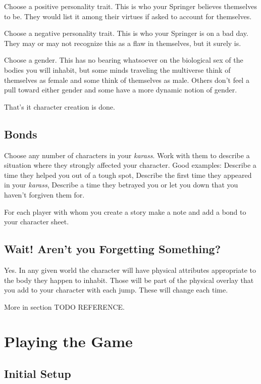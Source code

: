 \documentclass[letterpaper,12pt,landscape,twocolumn]{book}
\begin{document}
Choose a positive personality trait. This is who your Springer
believes themselves to be. They would list it among their virtues if
asked to account for themselves.

Choose a negative personality trait. This is who your Springer is on a
bad day. They may or may not recognize this as a flaw in themselves,
but it surely is.

Choose a gender. This has no bearing whatsoever on the biological sex
of the bodies you will inhabit, but some minds traveling the multiverse
think of themselves as female and some think of themselves as male.
Others don't feel a pull toward either gender and some have a more
dynamic notion of gender. 

That's it character creation is done. 

\section{Bonds}

Choose any number of characters in your \textit{karass}. Work with
them to describe a situation where they strongly affected your
character. Good examples: Describe a time they helped you out of a
tough spot, Describe the first time they appeared in your
\textit{karass}, Describe a time they betrayed you or let you down
that you haven't forgiven them for.

For each player with whom you create a story make a note and add a
bond to your character sheet.

\section{Wait! Aren't you Forgetting Something?}

Yes. In any given world the character will have physical attributes
appropriate to the body they happen to inhabit. Those will be part of
the physical overlay that you add to your character with each
jump. These will change each time.

More in section TODO REFERENCE.

\chapter{Playing the Game}

\section{Initial Setup}
\end{document}
